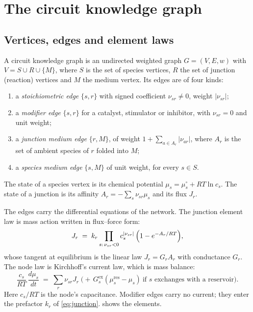 \section{The circuit knowledge graph}
\label{sec:model}

\subsection{Vertices, edges and element laws}
\label{sec:graph}

\begin{definition}
\label{def:ckg}
A circuit knowledge graph is an undirected weighted graph $G=(V,E,w)$ with $V = S \cup R \cup \{M\}$, where $S$ is the set of species vertices, $R$ the set of junction (reaction) vertices and $M$ the medium vertex.
Its edges are of four kinds:
\begin{enumerate}[label=(\roman*),itemsep=1pt]
  \item a \emph{stoichiometric edge} $\{s,r\}$ with signed coefficient $\nu_{sr}\neq0$, weight $|\nu_{sr}|$;
  \item a \emph{modifier edge} $\{s,r\}$ for a catalyst, stimulator or inhibitor, with $\nu_{sr}=0$ and unit weight;
  \item a \emph{junction medium edge} $\{r,M\}$, of weight $1+\sum_{a\in A_r}|\nu_{ar}|$, where $A_r$ is the set of ambient species of $r$ folded into $M$;
  \item a \emph{species medium edge} $\{s,M\}$ of unit weight, for every $s\in S$.
\end{enumerate}
The state of a species vertex is its chemical potential $\mu_s=\mu_s^\circ+RT\ln c_s$.
The state of a junction is its affinity $A_r=-\sum_s \nu_{sr}\mu_s$ and its flux $J_r$.
\end{definition}

The edges carry the differential equations of the network.
The junction element law is mass action written in flux--force form:
\begin{equation}
  J_r \;=\; k_r \prod_{s:\,\nu_{sr}<0} c_s^{|\nu_{sr}|}\,\Bigl(1-e^{-A_r/RT}\Bigr),
  \label{eq:junction}
\end{equation}
whose tangent at equilibrium is the linear law $J_r = G_r A_r$ with conductance $G_r$.
The node law is Kirchhoff's current law, which is mass balance:
\begin{equation}
  \frac{c_s}{RT}\,\frac{d\mu_s}{dt} \;=\; \sum_{r} \nu_{sr} J_r \;\bigl(+\,G^{\mathrm{ex}}_s(\mu^{\mathrm{res}}_s-\mu_s)\ \text{if $s$ exchanges with a reservoir}\bigr).
  \label{eq:node}
\end{equation}
Here $c_s/RT$ is the node's capacitance.
Modifier edges carry no current; they enter the prefactor $k_r$ of \cref{eq:junction}.
 shows the elements.

